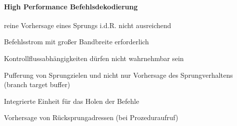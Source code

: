 \documentclass[a4paper]{article}
\begin{document}
\begin{multicols}{3}
  \paragraph{High Performance Befehlsdekodierung}
  reine Vorhersage eines Sprungs i.d.R. nicht ausreichend
  \begin{itemize*}
    \item Befehlsstrom mit großer Bandbreite erforderlich
    \item Kontrollflussabhängigkeiten dürfen nicht wahrnehmbar sein 
    \item Pufferung von Sprungzielen und nicht nur Vorhersage des Sprungverhaltens (branch target buffer)
    \item Integrierte Einheit für das Holen der Befehle
    \item Vorhersage von Rücksprungadressen (bei Prozeduraufruf)
  \end{itemize*}
  

\end{multicols}
\end{document}
